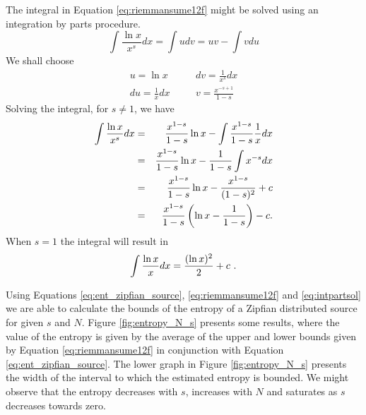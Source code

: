 The integral in Equation \ref{eq:riemmansume12f} might be solved using an
integration by parts procedure. 
\begin{equation}
\label{eq:intparts}
\int \frac{\ln x}{x^s} dx = \int u dv = uv - \int v du
\end{equation}
We shall choose 
\begin{eqnarray}
\label{eq:intpartsuv}
u = \ln x           & \quad & dv = \frac{1}{x^s} dx \nonumber \\
du = \frac{1}{x} dx & \quad & v = \frac{x^{-s+1}}{1-s} 
\end{eqnarray}
Solving the integral, for $s \neq 1$, we have
\begin{eqnarray}
\label{eq:intpartsol}
\int \frac{\ln x}{x^s} dx &=& \frac{x^{1-s}}{1-s} \ln x - \int \frac{x^{1-s}}{1-s} \frac{1}{x} dx \nonumber \\
        &=& \frac{x^{1-s}}{1-s} \ln x - \frac{1}{1-s} \int x^{-s} dx \nonumber \\
        &=& \frac{x^{1-s}}{1-s} \ln x - \frac{x^{1-s}}{(1-s)^2} + c \nonumber \\
        &=& \frac{x^{1-s}}{1-s} \left( \ln x - \frac{1}{1-s} \right) - c \textmd{.}
\end{eqnarray}
When $s=1$ the integral will
result in
\begin{equation}
\label{eq:intpartss1}
\int \frac{\ln x}{x} dx = \frac{(\ln x)^2}{2} + c \textmd{ .}
\end{equation}

 
Using Equations \ref{eq:ent_zipfian_source}, \ref{eq:riemmansume12f} and \ref{eq:intpartsol}
we are able to calculate the bounds of the entropy of a Zipfian distributed source
for given $s$ and $N$. Figure \ref{fig:entropy_N_s} presents some results, where
the value of the entropy is given by the average of the upper and lower bounds given
by Equation \ref{eq:riemmansume12f} in conjunction with Equation \ref{eq:ent_zipfian_source}.
The lower graph in Figure \ref{fig:entropy_N_s} presents the width of the interval to which
the estimated entropy is bounded. We might observe
that the entropy decreases with $s$, increases with $N$ and saturates as $s$ decreases towards zero.



